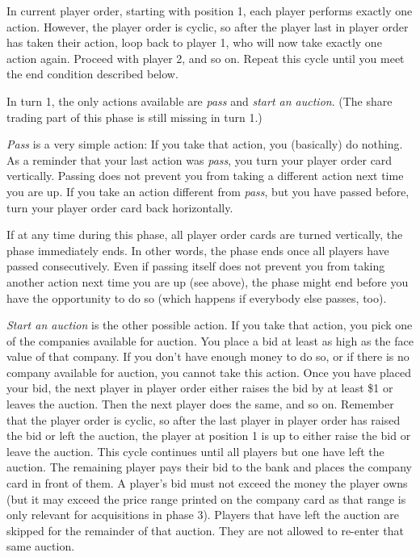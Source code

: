 \documentclass[10pt,final]{report}
\begin{document}
\begin{multicols}{2}
In current player order, starting with position 1, each player performs
exactly one action. However, the player order is cyclic, so after the
player last in player order has taken their action, loop back to
player 1, who will now take exactly one action again. Proceed with
player 2, and so on. Repeat this cycle until you meet the end
condition described below.

In turn 1, the only actions available are \emph{pass} and \emph{start
  an auction}. (The share trading part of this phase is still missing
in turn 1.)

\emph{Pass} is a very simple action: If you take that action, you
(basically) do nothing. As a reminder that your last action was
\emph{pass}, you turn your player order card vertically. Passing does
not prevent you from taking a different action next time you are up.
If you take an action different from \emph{pass}, but you have passed
before, turn your player order card back horizontally.

If at any time during this phase, all player order cards are turned
vertically, the phase immediately ends. In other words, the phase
ends once all players have passed consecutively. Even if passing
itself does not prevent you from taking another action next time you
are up (see above), the phase might end before you have the
opportunity to do so (which happens if everybody else passes, too).

\emph{Start an auction} is the other possible action. If you take that
action, you pick one of the companies available for auction. You place
a bid at least as high as the face value of that company. If you don't
have enough money to do so, or if there is no company available for
auction, you cannot take this action. Once you have placed your bid,
the next player in player order either raises the bid by at least \$1
or leaves the auction. Then the next player does the same, and so
on. Remember that the player order is cyclic, so after the last player
in player order has raised the bid or left the auction, the player at
position 1 is up to either raise the bid or leave the auction. This
cycle continues until all players but one have left the auction.  The
remaining player pays their bid to the bank and places the company
card in front of them. A player's bid must not exceed the money the
player owns (but it may exceed the price range printed on the company
card as that range is only relevant for acquisitions in phase
3). Players that have left the auction are skipped for the remainder
of that auction. They are not allowed to re-enter that same auction.


\end{multicols}
\end{document}
